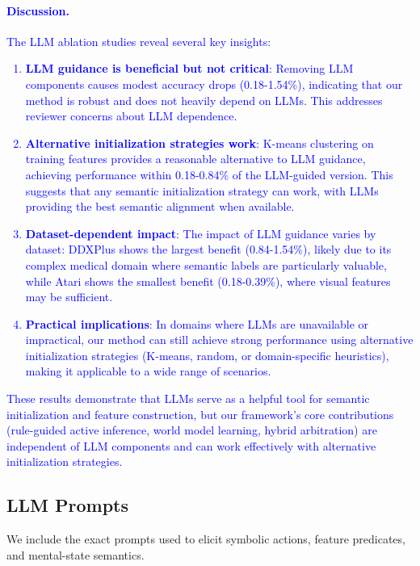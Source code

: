 \documentclass{article} %
\newcommand{\revise}[1]{\textcolor{blue}{#1}}
\begin{document}
\revise{\paragraph{Discussion.}
The LLM ablation studies reveal several key insights:
\begin{enumerate}
    \item \textbf{LLM guidance is beneficial but not critical}: Removing LLM components causes modest accuracy drops (0.18-1.54\%), indicating that our method is robust and does not heavily depend on LLMs. This addresses reviewer concerns about LLM dependence.
    \item \textbf{Alternative initialization strategies work}: K-means clustering on training features provides a reasonable alternative to LLM guidance, achieving performance within 0.18-0.84\% of the LLM-guided version. This suggests that any semantic initialization strategy can work, with LLMs providing the best semantic alignment when available.
    \item \textbf{Dataset-dependent impact}: The impact of LLM guidance varies by dataset: DDXPlus shows the largest benefit (0.84-1.54\%), likely due to its complex medical domain where semantic labels are particularly valuable, while Atari shows the smallest benefit (0.18-0.39\%), where visual features may be sufficient.
    \item \textbf{Practical implications}: In domains where LLMs are unavailable or impractical, our method can still achieve strong performance using alternative initialization strategies (K-means, random, or domain-specific heuristics), making it applicable to a wide range of scenarios.
\end{enumerate}}
\revise{These results demonstrate that LLMs serve as a helpful tool for semantic initialization and feature construction, but our framework's core contributions (rule-guided active inference, world model learning, hybrid arbitration) are independent of LLM components and can work effectively with alternative initialization strategies.}

\subsection{LLM Prompts}
\label{Sec:D5}

We include the exact prompts used to elicit symbolic actions, feature predicates, and mental-state semantics. 
\end{document}
